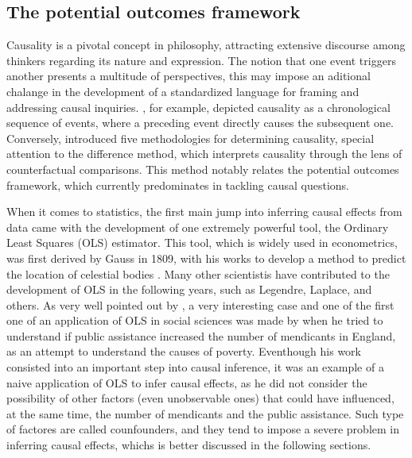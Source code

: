 \subsection{The potential outcomes framework}
\label{sub:potential_outcomes_framework}

Causality is a pivotal concept in philosophy, attracting extensive discourse among thinkers regarding its nature and expression. The notion 
that one event triggers another presents a multitude of perspectives, this may impose an aditional chalange in the development of a standardized 
language for framing and addressing causal inquiries. \textcite{hume_enquiry_1993}, for example, depicted causality as a chronological sequence of events, where a 
preceding event directly causes the subsequent one. Conversely, \textcite{mill_system_2020} introduced five methodologies for determining 
causality, special attention to the difference method, which interprets causality through the lens of counterfactual comparisons. This method notably 
relates the potential outcomes framework, which currently predominates in tackling causal questions.

When it comes to statistics, the first main jump into inferring causal effects from data came with the development of one extremely powerful tool,
the Ordinary Least Squares (\Gls{OLS}) estimator. This tool, which is widely used in econometrics, was first derived by Gauss in 1809, with his works
to develop a method to predict the location of celestial bodies \parencite{gauss_c_f_theoria_1809}. Many other scientistis have contributed to the development
of \gls{OLS} in the following years, such as Legendre, Laplace, and others. As very well pointed out by \textcite{cunningham_causal_2021}, a very interesting
case and one of the first one of an application of \gls{OLS} in social sciences was made by \textcite{yule_investigation_1899} when he tried to 
understand if public assistance increased the number of mendicants in England, as an attempt to understand the causes of poverty. Eventhough his work
consisted into an important step into causal inference, it was an example of a naive application of \gls{OLS} to infer causal effects, as he did not
consider the possibility of other factors (even unobservable ones) that could have influenced, at the same time, the number of mendicants and the public assistance.
Such type of factores are called counfounders, and they tend to impose a severe problem in inferring causal effects, whichs is better discussed in the following sections.

